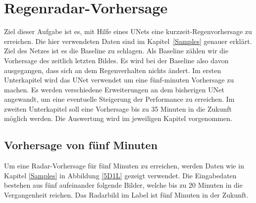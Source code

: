 \section{Regenradar-Vorhersage}
Ziel dieser Aufgabe ist es, mit Hilfe eines UNets eine kurzzeit-Regenvorhersage zu erreichen. Die hier verwendeten Daten sind im Kapitel~\ref{Samples} genauer erklärt. Ziel des Netzes ist es die Baseline zu schlagen. Als Baseline zählen wir die Vorhersage des zeitlich letzten Bildes. Es wird bei der Baseline also davon ausgegangen, dass sich an dem Regenverhalten nichts ändert. Im ersten Unterkapitel wird das UNet verwendet um eine fünf-minuten Vorhersage zu machen. Es werden verschiedene Erweiterungen an dem bisherigen UNet angewandt, um eine eventuelle Steigerung der Performance zu erreichen. Im zweiten Unterkapitel soll eine Vorhersage bis zu 35 Minuten in die Zukunft möglich werden. Die Auswertung wird im jeweiligen Kapitel vorgenommen.

\subsection{Vorhersage von fünf Minuten}
Um eine Radar-Vorhersage für fünf Minuten zu erreichen, werden Daten wie in Kapitel \ref{Samples} in Abbildung \ref{5D1L} gezeigt verwendet. Die Eingabedaten bestehen aus fünf aufeinander folgende Bilder, welche bis zu 20 Minuten in die Vergangenheit reichen. Das Radarbild im Label ist fünf Minuten in der Zukunft.

